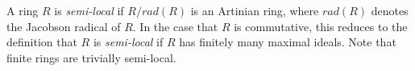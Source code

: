 \documentclass[12pt]{article}
\begin{document}
A ring $R$ is \emph{semi-local} if $R/rad(R)$ is an Artinian ring, where $rad(R)$ denotes the Jacobson radical of $R$.  In the case that $R$ is commutative, this reduces to the definition that $R$ is \emph{semi-local} if $R$ has finitely many maximal ideals.  Note that finite rings are trivially semi-local.
\end{document}
